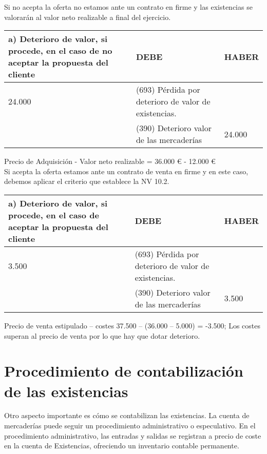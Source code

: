 \documentclass{article}
\begin{document}
Si no acepta la oferta no estamos ante un contrato en firme y las existencias se valorarán al valor neto realizable a final del ejercicio.

\begin{table}[H]
\centering
\begin{tabular}{|p{4cm}|p{4cm}|p{4cm}|}
\hline
\textbf{a) Deterioro de valor, si procede, en el caso de no aceptar la propuesta del cliente} & \textbf{DEBE} & \textbf{HABER} \\
\hline
24.000 & (693) Pérdida por deterioro de valor de existencias. & \\
 & (390) Deterioro valor de las mercaderías & 24.000 \\
\hline
\end{tabular}
\end{table}

Precio de Adquisición - Valor neto realizable = 36.000 € - 12.000 €\\

Si acepta la oferta estamos ante un contrato de venta en firme y en este caso, debemos aplicar el criterio que establece la NV 10.2.

\begin{table}[H]
\centering
\begin{tabular}{|p{4cm}|p{4cm}|p{4cm}|}
\hline
\textbf{a) Deterioro de valor, si procede, en el caso de aceptar la propuesta del cliente} & \textbf{DEBE} & \textbf{HABER} \\
\hline
3.500 & (693) Pérdida por deterioro de valor de existencias. & \\
 & (390) Deterioro valor de las mercaderías & 3.500 \\
\hline
\end{tabular}
\end{table}

Precio de venta estipulado – costes 37.500 – (36.000 – 5.000) = -3.500; Los costes superan al precio de venta por lo que hay que dotar deterioro.


\section{Procedimiento de contabilización de las existencias}


Otro aspecto importante es cómo se contabilizan las existencias. La cuenta de mercaderías puede seguir un procedimiento administrativo o especulativo. En el procedimiento administrativo, las entradas y salidas se registran a precio de coste en la cuenta de Existencias, ofreciendo un inventario contable permanente.
\end{document}
